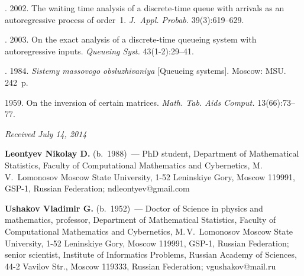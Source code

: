  \begin{multicols}{2}

\renewcommand{\bibname}{\protect\rmfamily References}

{\small\frenchspacing
 {%
 \begin{thebibliography}{9}


. 2002.
The waiting time analysis of a discrete-time queue with arrivals as an
autoregressive process of order~1. \textit{J.~Appl. Probab.} 39(3):619--629.

. 2003.
On the exact analysis of a discrete-time queueing system with autoregressive
inputs. \textit{Queueing Syst.} 43(1-2):29--41.

\vspace*{-1pt}

. 1984.
\textit{Sistemy massovogo obsluzhivaniya} [{Queueing systems}]. Moscow: MSU. 242~p.

\vspace*{-1pt}

 1959. On the inversion of certain matrices.
\textit{Math. Tab. Aids Comput.} 13(66):73--77.

\end{thebibliography}

 }
 }

\end{multicols}

\vspace*{-6pt}

\hfill{\small\textit{Received July 14, 2014}}

\vspace*{-12pt}

\Contr

\noindent
\textbf{Leontyev Nikolay D.} (b.\ 1988)~---
PhD student, Department of Mathematical Statistics,
Faculty of Computational Mathematics and Cybernetics,
M.\,V.~Lomonosov Moscow State University,
1-52 Leninskiye Gory,
Moscow 119991, GSP-1, Russian Federation; ndleontyev@gmail.com

\vspace*{3pt}

\noindent
\textbf{Ushakov Vladimir G.} (b.\ 1952)~---
Doctor of Science in physics and mathematics, professor,
Department of Mathematical Statistics, Faculty of Computational
Mathematics and Cybernetics, M.\,V.~Lomonosov Moscow State University,
1-52 Leninskiye Gory,
Moscow 119991, GSP-1, Russian Federation;
senior scientist, Institute of Informatics Problems,
Russian Academy of Sciences, 44-2 Vavilov Str., Moscow 119333, Russian
Federation; vgushakov@mail.ru


\label{end\stat}

\renewcommand{\bibname}{\protect\rm Литература}
